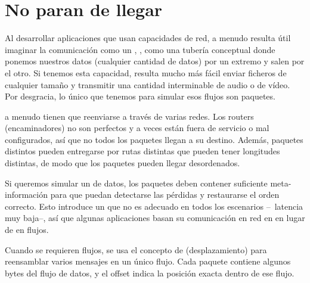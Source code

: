 \section{No paran de llegar}\label{sec:packets:stream}

Al desarrollar aplicaciones que usan capacidades de red, a menudo resulta útil 
imaginar la comunicación como un , \ie, como una tubería conceptual donde ponemos 
nuestros datos (cualquier cantidad de datos) por un extremo y salen por el otro. Si tenemos
esta capacidad, resulta mucho más fácil enviar ficheros de cualquier tamaño y transmitir una cantidad interminable
de audio o de vídeo. Por desgracia, lo único que tenemos para simular esos flujos son paquetes.

 a menudo tienen que reenviarse a través de varias redes. Los routers (encaminadores) no son perfectos
y a veces están fuera de servicio o mal configurados, así que no todos los paquetes llegan a su destino. Además,
paquetes distintos pueden entregarse por rutas distintas que pueden tener longitudes distintas, de modo que los paquetes pueden llegar
desordenados.

Si queremos simular un  de datos, los paquetes deben contener suficiente meta-información para que puedan detectarse las pérdidas y 
restaurarse el orden correcto. Esto introduce un  que no es adecuado en todos los escenarios --\eg\ latencia muy baja--,
así que algunas aplicaciones basan su comunicación en red en  en lugar de en flujos.

Cuando se requieren flujos, se usa el concepto de  (desplazamiento) para reensamblar varios mensajes en 
un único flujo. Cada paquete contiene algunos bytes del flujo de datos, y el offset indica la posición exacta dentro de ese flujo.

